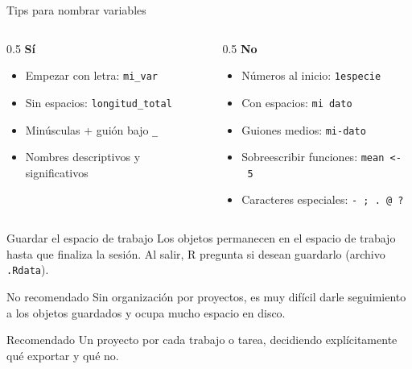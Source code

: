 \documentclass[
  9pt,
  ignorenonframetext,
]{beamer}
\providecommand{\tightlist}{%
  \setlength{\itemsep}{0pt}\setlength{\parskip}{0pt}}\usepackage{longtable,booktabs,array}
\begin{document}
\begin{frame}[fragile]{Tips para nombrar variables}
\label{tips-para-nombrar-variables}
\begin{columns}[T]
\begin{column}{0.5\textwidth}
\textbf{Sí}

\begin{itemize}
\tightlist
\item
  Empezar con letra: \texttt{mi\_var}
\item
  Sin espacios: \texttt{longitud\_total}
\item
  Minúsculas + guión bajo \texttt{\_}
\item
  Nombres descriptivos y significativos
\end{itemize}
\end{column}

\begin{column}{0.5\textwidth}
\textbf{No}

\begin{itemize}
\tightlist
\item
  Números al inicio: \texttt{1especie}
\item
  Con espacios: \texttt{mi\ dato}
\item
  Guiones medios: \texttt{mi-dato}
\item
  Sobreescribir funciones: \texttt{mean\ \textless{}-\ 5}
\item
  Caracteres especiales: \texttt{-\ ;\ .\ @\ ?}
\end{itemize}
\end{column}
\end{columns}
\end{frame}

\begin{frame}[fragile]{Guardar el espacio de trabajo}
\label{guardar-el-espacio-de-trabajo}
Los objetos permanecen en el espacio de trabajo hasta que finaliza la
sesión. Al salir, R pregunta si desean guardarlo (archivo
\texttt{.Rdata}).

\begin{alertblock}{No recomendado}
Sin organización por proyectos, es muy difícil darle seguimiento a los objetos guardados y ocupa mucho espacio en disco.
\end{alertblock}

\begin{exampleblock}{Recomendado}
Un proyecto por cada trabajo o tarea, decidiendo explícitamente qué exportar y qué no.
\end{exampleblock}
\end{frame}
\end{document}
